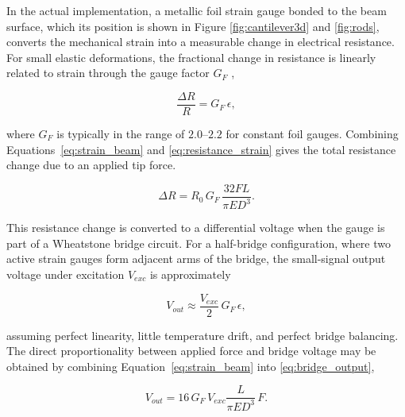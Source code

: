 
In the actual implementation, a metallic foil strain gauge bonded to the beam surface, which its position is shown in Figure \ref{fig:cantilever3d} and \ref{fig:rods}, converts the mechanical strain into a measurable change in electrical resistance. For small elastic deformations, the fractional change in resistance is linearly related to strain through the gauge factor $G_F$ \cite{fraden2016handbook,MicroMeasurements,OmegaSG},

\begin{equation}
	\frac{\Delta R}{R} = {G_F} \, \epsilon,
	\label{eq:resistance_strain}
\end{equation}

\noindent
where $G_F$ is typically in the range of $2.0$–$2.2$ for constant foil gauges. 
Combining Equations~\ref{eq:strain_beam} and \ref{eq:resistance_strain} gives the total resistance change due to an applied tip force.

\begin{equation}
	\Delta R = R_0 \, {G_F} \, \frac{32 F L}{\pi E D^3}.
	\label{eq:resistance_force}
\end{equation}

\noindent
This resistance change is converted to a differential voltage when the gauge is part of a Wheatstone bridge circuit. For a half-bridge configuration, where two active strain gauges form adjacent arms of the bridge, the small-signal output voltage under excitation $V_{exc}$ is approximately \cite{fraden2016handbook,NI_AN078_1998}

\begin{equation}
	V_{out} \approx \frac{V_{exc}}{2} \, G_F \, \epsilon,
	\label{eq:bridge_output}
\end{equation}

\noindent assuming perfect linearity, little temperature drift, and perfect bridge balancing. The direct proportionality between applied force and bridge voltage may be obtained by combining Equation~\ref{eq:strain_beam} into \ref{eq:bridge_output},

\begin{equation}
	V_{out} = 16 \, G_F \, V_{exc} \frac{L}{\pi E D^3} \, F.
	\label{eq:force_to_voltage}
\end{equation}

